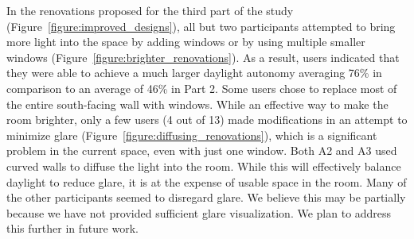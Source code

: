 \documentclass{article}
\begin{document}
In the renovations proposed for the third part of the study
(Figure~\ref{figure:improved_designs}), all but two participants
attempted to bring more light into the space by adding windows or by
using multiple smaller windows
(Figure~\ref{figure:brighter_renovations}).
%
As a result, users indicated that they were able to achieve a much
larger daylight autonomy averaging 76\% in comparison to an average of
46\% 
in Part 2.  Some users chose to replace most of the entire
south-facing wall with windows.  While an effective way to make the
room brighter, only a few users (4 out of 13) made modifications in an
attempt to minimize glare (Figure~\ref{figure:diffusing_renovations}),
which is a significant problem in the current space, even with just
one window.  Both A2 and A3 used curved walls to diffuse the light
into the room.  While this will effectively balance daylight to reduce
glare, it is at the expense of usable space in the room.  
Many of the other participants seemed to disregard glare.  We believe
this may be partially because we have not provided sufficient glare
visualization.  We plan to address this further in future work.


\end{document}
